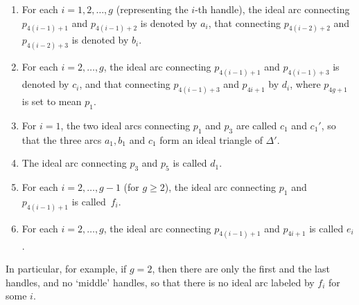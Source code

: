 \documentclass[pdftex]{sigma}
\numberwithin{equation}{section}
\theoremstyle{definition}
\begin{document}
\begin{enumerate}[label={\rm (IA\arabic*)}]\itemsep=0pt\setlength{\leftskip}{0.12cm}
\item For each $i = 1,2,\dots,g$ (representing the $i$-th handle), the ideal arc connecting $p_{4(i-1)+1}$ and $p_{4(i-1)+2}$ is denoted by $a_i$, that connecting $p_{4(i-2)+2}$ and $p_{4(i-2)+3}$ is denoted by $b_i$.
\item For each $i=2,\dots,g$, the ideal arc connecting $p_{4(i-1)+1}$ and $p_{4(i-1)+3}$ is denoted by $c_i$, and that connecting $p_{4(i-1)+3}$ and $p_{4i+1}$ by $d_i$, where $p_{4g+1}$ is set to mean $p_1$.
\item For $i=1$, the two ideal arcs connecting $p_1$ and $p_3$ are called $c_1$ and $c_1'$, so that the three arcs $a_1,b_1$ and $c_1$ form an ideal triangle of $\Delta'$.
\item The ideal arc connecting $p_3$ and $p_5$ is called $d_1$.
\item For each $i=2,\dots,g-1$ (for $g \ge 2$), the ideal arc connecting $p_1$ and $p_{4(i-1)+1}$ is called~$f_i$.
\item For each $i=2,\dots,g$, the ideal arc connecting $p_{4(i-1)+1}$ and $p_{4i+1}$ is called $e_i$.
\end{enumerate}
In particular, for example, if $g=2$, then there are only the first and the last handles, and no `middle' handles, so that there is no ideal arc labeled by $f_i$ for some $i$.
\end{document}
